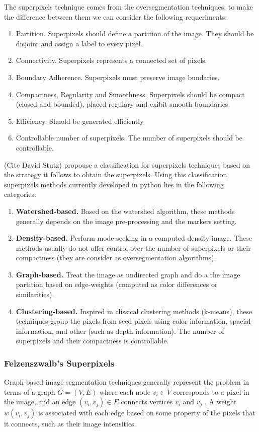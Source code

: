 The superpixels technique comes from the oversegmentation techniques; to make the difference between them we can consider the following requeriments:
\begin{enumerate}
 \item Partition. Superpixels should define a partition of the image. They should be disjoint and assign a label to every pixel.
 \item Connectivity. Superpixels represents a connected set of pixels.
 \item Boundary Adherence. Superpixels must preserve image bundaries.
 \item Compactness, Regularity and Smoothness. Superpixels should be compact (closed and bounded), placed regulary and exibit smooth boundaries.
 \item Efficiency. Shuold be generated efficiently
 \item Controllable number of superpixels. The number of superpixels should be controllable.
\end{enumerate}

(Cite David Stutz) propouse a classification for superpixels techniques based on the strategy it follows to obtain the superpixels. Using this classification, superpixels methods currently developed in python lies in the following categories:
\begin{enumerate}
 \item \textbf{Watershed-based.} Based on the watershed algorithm, these methods generally depends on the image pre-processing and the markers setting. 
 \item \textbf{Density-based.} Perform mode-seeking in a computed density image. These methods usually do not offer control over the number of superpixels or their compactness (they are consider as oversegmentation algorithms). 
 \item \textbf{Graph-based.} Treat the image as undirected graph and do a the image partition based on edge-weights  (computed as color differences or similarities).
 \item \textbf{Clustering-based.} Inspired in clissical clustering methods (k-means), these techniques group the pixels from seed pixels using color information, spacial information, and other (such as depth information). The number of superpixels and their compactness is controllable.
\end{enumerate}


\subsubsection{Felzenszwalb's Superpixels}
Graph-based image segmentation techniques generally represent the problem in terms of a graph $G = (V, E)$ where each node $v_i \in V$ corresponds to a pixel in the image, and an edge $(v_i, v_j) \in E$ connects vertices $v_i$ and $v_j$ . A weight $w(v_i, v_j)$ is associated with each edge based on some property of the pixels that it connects, such as their image intensities.

